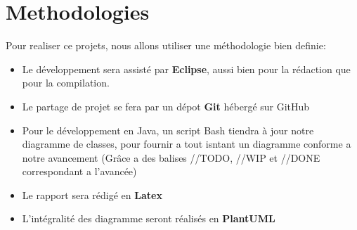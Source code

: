    \section{Methodologies}
        Pour realiser ce projets, nous allons utiliser une méthodologie bien definie:\\
        \begin{itemize}
            \item Le développement sera assisté par \textbf{Eclipse}, aussi bien pour la rédaction que pour la compilation.
            \item Le partage de projet se fera par un dépot \textbf{Git} hébergé sur GitHub
            \item Pour le développement en Java, un script Bash tiendra à jour notre diagramme de classes, pour fournir a tout isntant un diagramme conforme a notre avancement (Grâce a des balises //TODO, //WIP et //DONE correspondant a l'avancée)
            \item Le rapport sera rédigé en \textbf{Latex}
            \item L'intégralité des diagramme seront réalisés en \textbf{PlantUML}
        \end{itemize}
